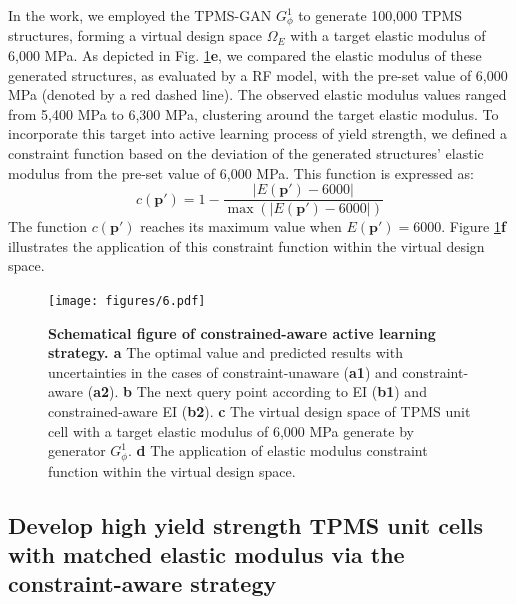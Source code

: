 \documentclass[preprint,review,12pt,authoryear]{elsarticle}
\begin{document}
In  the work, we employed the TPMS-GAN $G_\phi^1$ to generate 100,000 TPMS structures, forming a virtual design space $\Omega_E$ with a target elastic modulus of 6,000 MPa. As depicted in Fig. \ref{fig:6}\textbf{e}, we compared the elastic modulus of these generated structures, as evaluated by a RF model, with the pre-set value of 6,000 MPa (denoted by a red dashed line). The observed elastic modulus values ranged from 5,400 MPa to 6,300 MPa, clustering around the target elastic modulus. To incorporate this target into active learning process of yield strength, we defined a constraint function based on the deviation of the generated structures' elastic modulus from the pre-set value of 6,000 MPa. This function is expressed as:
\begin{equation}
    c(\boldsymbol{p}') = 1 - \frac{|E(\boldsymbol{p}') - 6000|}{\max(|E(\boldsymbol{p}') - 6000|)}
\label{eq:22}
\end{equation}
The function $c(\boldsymbol{p}')$ reaches its maximum value when $E(\boldsymbol{p}') = 6000$. Figure \ref{fig:6}\textbf{f} illustrates the application of this constraint function within the virtual design space.

\begin{figure}
    \centering
    \texttt{[image: figures/6.pdf]}
    \caption{\textbf{Schematical figure of constrained-aware active learning strategy. a} The optimal value and predicted results with uncertainties in the cases of constraint-unaware (\textbf{a1}) and constraint-aware (\textbf{a2}). \textbf{b} The next query point according to EI (\textbf{b1}) and constrained-aware EI (\textbf{b2}). \textbf{c} The virtual design space of TPMS unit cell with a target elastic modulus of 6,000 MPa generate by generator $G_\phi^1$. \textbf{d} The application of elastic modulus constraint function within the virtual design space.}
    \label{fig:6}
\end{figure}

\subsection{Develop high yield strength TPMS unit cells with matched elastic modulus via the constraint-aware strategy}
\end{document}
